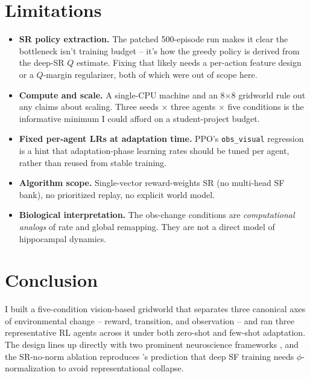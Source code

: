 \documentclass{article}
\begin{document}
\section{Limitations}
\label{sec:limitations}

\begin{itemize}
  \item \textbf{SR policy extraction.} The patched 500-episode run makes it clear the bottleneck isn't training budget -- it's how the greedy policy is derived from the deep-SR $Q$ estimate. Fixing that likely needs a per-action feature design or a $Q$-margin regularizer, both of which were out of scope here.
  \item \textbf{Compute and scale.} A single-CPU machine and an 8$\times$8 gridworld rule out any claims about scaling. Three seeds $\times$ three agents $\times$ five conditions is the informative minimum I could afford on a student-project budget.
  \item \textbf{Fixed per-agent LRs at adaptation time.} PPO's \texttt{obs\_visual} regression is a hint that adaptation-phase learning rates should be tuned per agent, rather than reused from stable training.
  \item \textbf{Algorithm scope.} Single-vector reward-weights SR (no multi-head SF bank), no prioritized replay, no explicit world model.
  \item \textbf{Biological interpretation.} The obs-change conditions are \emph{computational analogs} of rate and global remapping. They are not a direct model of hippocampal dynamics.
\end{itemize}

\section{Conclusion}
\label{sec:conclusion}

I built a five-condition vision-based gridworld that separates three canonical axes of environmental change -- reward, transition, and observation -- and ran three representative RL agents across it under both zero-shot and few-shot adaptation. The design lines up directly with two prominent neuroscience frameworks \citep{momennejad2017sr,sanders2020remap}, and the SR-no-norm ablation reproduces \citet{lehnert2024sf}'s prediction that deep SF training needs $\phi$-normalization to avoid representational collapse.
\end{document}
